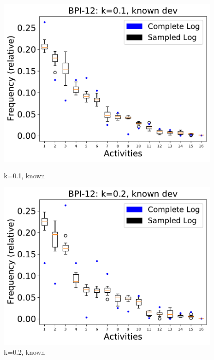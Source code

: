 \documentclass[landscape]{article}
\begin{document}
\begin{figure}[!htb]
	\centering
	\begin{minipage}{0.2\textwidth}
		\includegraphics[width=1.0\textwidth]{../BPI_Challenge_2012/BPI_Challenge_2012_deviationsApprox_0.1_NONALIGNING_KNOWN.pdf}
		\caption{k=0.1, known}
	\end{minipage}
	\hfill
	\begin{minipage}{0.2\textwidth}
		\includegraphics[width=1.0\textwidth]{../BPI_Challenge_2012/BPI_Challenge_2012_deviationsApprox_0.2_NONALIGNING_KNOWN.pdf}
		\caption{k=0.2, known}
	\end{minipage}
	\hfill
	\begin{minipage}{0.2\textwidth}

\end{minipage}
\end{figure}
\end{document}
